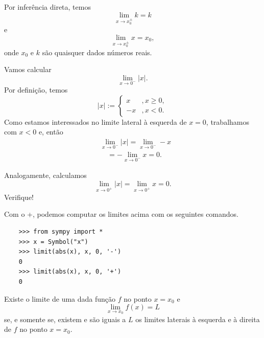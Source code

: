 \begin{obs}
  Por inferência direta, temos
  \begin{equation}
    \lim_{x\to x_0^{\pm}} k = k
  \end{equation}
  e
  \begin{equation}
    \lim_{x\to x_0^{\pm}} x = x_0,
  \end{equation}
  onde $x_0$ e $k$ são quaisquer dados números reais.
\end{obs}

\begin{exer}\label{ex:lim_absx}
  Vamos calcular
  \begin{equation}
    \lim_{x\to 0^-} |x|.
  \end{equation}
  Por definição, temos
  \begin{equation}
    |x| := \left\{
      \begin{array}{ll}
        x &, x\geq 0,\\
        -x &, x< 0.
      \end{array}
    \right.
  \end{equation}
  Como estamos interessados no limite lateral à esquerda de $x=0$, trabalhamos com $x<0$ e, então
  \begin{align}
    & \lim_{x\to 0^-} |x| = \lim_{x\to 0^-} -x \\
    & \text{}\quad = -\lim_{x\to 0^-} x = 0.
  \end{align}
  
  Analogamente, calculamos
  \begin{equation}
    \lim_{x\to 0^+} |x| = \lim_{x\to 0^+} x = 0.
  \end{equation}
  Verifique!

  \ifispython
  Com o {\python}+{\sympy}, podemos computar os limites acima com os seguintes comandos.
  \begin{lstlisting}
    >>> from sympy import *
    >>> x = Symbol("x")
    >>> limit(abs(x), x, 0, '-')
    0
    >>> limit(abs(x), x, 0, '+')
    0
  \end{lstlisting}
  \fi
\end{exer}

\begin{teo}\label{teo:lim_existe}
  Existe o limite de uma dada função $f$ no ponto $x=x_0$ e
  \begin{equation}
    \lim_{x\to x_0} f(x) = L
  \end{equation}
  se, e somente se, existem e são iguais a $L$ os limites laterais à esquerda e à direita de $f$ no ponto $x=x_0$.
\end{teo}

